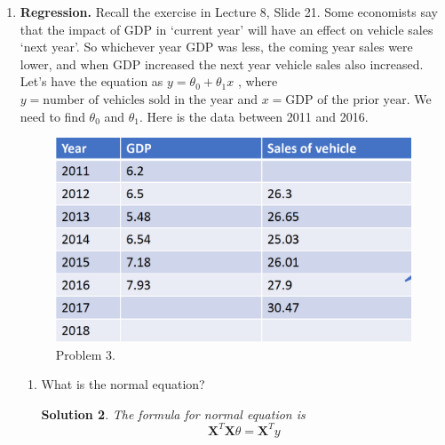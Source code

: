 \documentclass{article}
\newtheorem*{Solution}{Solution}
\begin{document}
\begin{enumerate}
\begin{enumerate}
\begin{Solution}
\begin{enumerate}
\begin{equation}
\begin{aligned}
            \le&\mathbb{E}\left[R(s,a,s')+\gamma\max_{a'}Q_t(s',a')|\mathcal{F}_{t}\right]^2\le C
            \end{aligned}
        \end{equation}
    \end{enumerate}
    Finally, based on the \textbf{Lemma 1}, we know $\Delta_t\rightarrow0$. \\Since $\mathbb{P}_{\pi}\left[A_{t}=a \mid S_{t}=s\right]>0$, we can conclude $Q_t(s,a)\rightarrow Q^\ast(s,a)$ for all state-action pairs.
    \end{Solution}
\end{enumerate}
\item \textbf{Regression.}
Recall the exercise in Lecture 8, Slide 21. Some economists say that the impact of GDP in `current year' will have an effect on vehicle sales `next year'. So whichever year GDP was less, the coming year sales were lower, and when GDP increased the next year vehicle sales also increased. Let's have the equation as 
$y=\theta_0+\theta_1 x$
, where $y = \text{number of vehicles sold in the year}$ and $x = \text{GDP of the prior year}$. We need to find $\theta_0$ and $\theta_1$. Here is the data between 2011 and 2016.
    	\begin{figure}[!htp]
    	    \centering
    	    \includegraphics[width=12cm]{figs/fig2.png}
    	    \caption{Problem 3.}
    	    \label{fig:p4}
    	\end{figure}
    	\begin{enumerate}
    	    \item What is the normal equation?
    	    \begin{Solution}
    	    The formula for normal equation is
    	    \begin{equation}
    	        \mathbf{X}^T\mathbf{X}\theta=\mathbf{X}^Ty
    	    \end{equation}

\end{Solution}
\end{enumerate}
\end{enumerate}
\end{document}
